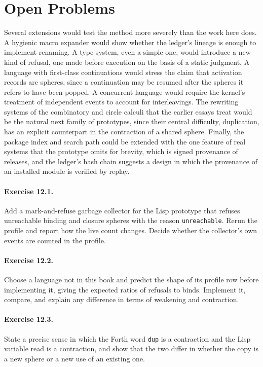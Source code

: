 \section{Open Problems}

Several extensions would test the method more severely than the work here does. A hygienic macro expander would show whether the ledger's lineage is enough to implement renaming. A type system, even a simple one, would introduce a new kind of refusal, one made before execution on the basis of a static judgment. A language with first-class continuations would stress the claim that activation records are spheres, since a continuation may be resumed after the spheres it refers to have been popped. A concurrent language would require the kernel's treatment of independent events to account for interleavings. The rewriting systems of the combinatory and circle calculi that the earlier essays treat would be the natural next family of prototypes, since their central difficulty, duplication, has an explicit counterpart in the contraction of a shared sphere. Finally, the package index and search path could be extended with the one feature of real systems that the prototype omits for brevity, which is signed provenance of releases, and the ledger's hash chain suggests a design in which the provenance of an installed module is verified by replay.

\paragraph{Exercise 12.1.} Add a mark-and-refuse garbage collector for the Lisp prototype that refuses unreachable binding and closure spheres with the reason \texttt{unreachable}. Rerun the profile and report how the live count changes. Decide whether the collector's own events are counted in the profile.

\paragraph{Exercise 12.2.} Choose a language not in this book and predict the shape of its profile row before implementing it, giving the expected ratios of refusals to binds. Implement it, compare, and explain any difference in terms of weakening and contraction.

\paragraph{Exercise 12.3.} State a precise sense in which the Forth word \texttt{dup} is a contraction and the Lisp variable read is a contraction, and show that the two differ in whether the copy is a new sphere or a new use of an existing one.

